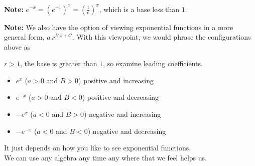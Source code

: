 \documentclass{ximera}
\begin{document}
\textbf{Note:}  $e^{-x} = \left( e^{-1} \right)^x = \left( \frac{1}{e} \right)^x$, which is a base less than $1$.


\textbf{Note:}  We also have the option of viewing exponential functions in a more general form, $a \, r^{B \, x + C}$.  With this viewpoint, we would phrase the configurations above as



$r > 1$, the base is greater than $1$, so examine leading coefficients.
\begin{itemize}
\item  $e^x$ ($a>0$ and $B>0$) positive and increasing
\item  $e^{-x}$ ($a>0$ and $B<0$) positive and decreasing
\item  $-e^x$ ($a<0$ and $B>0$) negative and increasing
\item  $-e^{-x}$ ($a<0$ and $B<0$) negative and decreasing
\end{itemize}





It just depends on how you like to see exponential functions. \\













We can use any algebra any time any where that we feel helps us.
\end{document}
